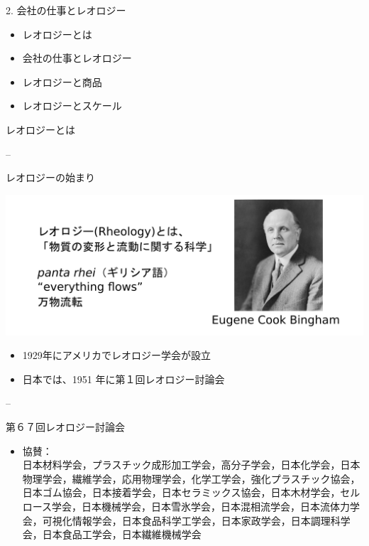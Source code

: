 \begin{frame}{2. 会社の仕事とレオロジー}

\begin{itemize}

\item
  レオロジーとは
\item
  会社の仕事とレオロジー
\item
  レオロジーと商品
\item
  レオロジーとスケール
\end{itemize}

\end{frame}

\begin{frame}{レオロジーとは}

--

\begin{block}{レオロジーの始まり}

\includegraphics{fig/fig_2/レオロジー.png}

\begin{itemize}

\item
  1929年にアメリカでレオロジー学会が設立
\item
  日本では、1951 年に第１回レオロジー討論会
\end{itemize}

--

\end{block}

\begin{block}{第６７回レオロジー討論会}

\begin{itemize}

\item
  協賛：\\
  日本材料学会，プラスチック成形加工学会，高分子学会，日本化学会，日本物理学会，繊維学会，応用物理学会，化学工学会，強化プラスチック協会，日本ゴム協会，日本接着学会，日本セラミックス協会，日本木材学会，セルロース学会，日本機械学会，日本雪氷学会，日本混相流学会，日本流体力学会，可視化情報学会，日本食品科学工学会，日本家政学会，日本調理科学会，日本食品工学会，日本繊維機械学会
\end{itemize}


\end{block}
\end{frame}
